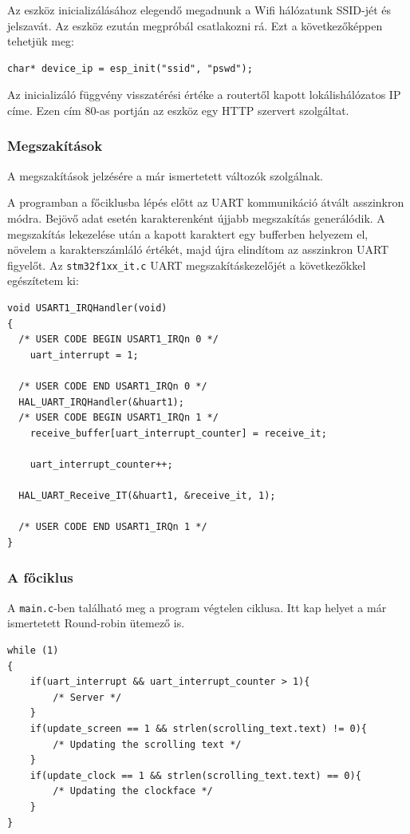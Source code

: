 \documentclass[a4paper, 12pt]{article}
\begin{document}
Az eszköz inicializálásához elegendő megadnunk a Wifi hálózatunk SSID-jét és jelszavát. Az eszköz ezután megpróbál csatlakozni rá. Ezt a következőképpen tehetjük meg:
\begin{lstlisting}[style=CStyle]
char* device_ip = esp_init("ssid", "pswd");
\end{lstlisting}
Az inicializáló függvény visszatérési értéke a routertől kapott lokálishálózatos IP címe. Ezen cím 80-as portján az eszköz egy HTTP szervert szolgáltat.

\subsubsection{Megszakítások}

A megszakítások jelzésére a már ismertetett változók szolgálnak.

A programban a főciklusba lépés előtt az UART kommunikáció átvált asszinkron módra. Bejövő adat esetén karakterenként újjabb megszakítás generálódik. A megszakítás lekezelése után a kapott karaktert egy bufferben helyezem el, növelem a karakterszámláló értékét, majd újra elindítom az asszinkron UART figyelőt.
Az \texttt{stm32f1xx\_it.c} UART megszakításkezelőjét a következőkkel egészítetem ki: 
\begin{lstlisting}[style=CStyle]
void USART1_IRQHandler(void)
{
  /* USER CODE BEGIN USART1_IRQn 0 */
	uart_interrupt = 1;

  /* USER CODE END USART1_IRQn 0 */
  HAL_UART_IRQHandler(&huart1);
  /* USER CODE BEGIN USART1_IRQn 1 */
	receive_buffer[uart_interrupt_counter] = receive_it;

	uart_interrupt_counter++;

  HAL_UART_Receive_IT(&huart1, &receive_it, 1);

  /* USER CODE END USART1_IRQn 1 */
}
\end{lstlisting}

\subsubsection{A főciklus}

A \texttt{main.c}-ben található meg a program végtelen ciklusa. Itt kap helyet a már ismertetett Round-robin ütemező is.

\begin{lstlisting}[style=CStyle]
while (1)
{
	if(uart_interrupt && uart_interrupt_counter > 1){
		/* Server */
	}
	if(update_screen == 1 && strlen(scrolling_text.text) != 0){
		/* Updating the scrolling text */
	}
	if(update_clock == 1 && strlen(scrolling_text.text) == 0){
		/* Updating the clockface */
	}
}
\end{lstlisting}
\end{document}
